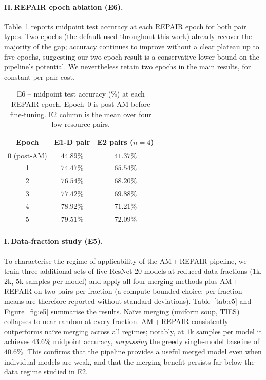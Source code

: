 \documentclass{article}
\begin{document}
\paragraph{H.\,REPAIR epoch ablation (E6).}
Table~\ref{tab:repair_ablation} reports midpoint test accuracy at each REPAIR epoch for both pair types. Two epochs (the default used throughout this work) already recover the majority of the gap; accuracy continues to improve without a clear plateau up to five epochs, suggesting our two-epoch result is a conservative lower bound on the pipeline's potential. We nevertheless retain two epochs in the main results, for constant per-pair cost.

\begin{table}[h]
\caption{E6 -- midpoint test accuracy (\%) at each REPAIR epoch. Epoch~0 is post-AM before fine-tuning. E2 column is the mean over four low-resource pairs.}
\label{tab:repair_ablation}
\begin{center}
\begin{small}
\begin{tabular}{ccc}
\toprule
Epoch & E1-D pair & E2 pairs ($n{=}4$) \\
\midrule
0 (post-AM) & $44.89\%$ & $41.37\%$ \\
1           & $74.47\%$ & $65.54\%$ \\
2           & $76.54\%$ & $68.20\%$ \\
3           & $77.42\%$ & $69.88\%$ \\
4           & $78.92\%$ & $71.21\%$ \\
5           & $79.51\%$ & $72.09\%$ \\
\bottomrule
\end{tabular}
\end{small}
\end{center}
\end{table}

\paragraph{I.\,Data-fraction study (E5).}
To characterise the regime of applicability of the AM\,+\,REPAIR pipeline, we train three additional sets of five ResNet-20 models at reduced data fractions ($1$k, $2$k, $5$k samples per model) and apply all four merging methods plus AM\,+\,REPAIR on two pairs per fraction (a compute-bounded choice; per-fraction means are therefore reported without standard deviations). Table~\ref{tab:e5} and Figure~\ref{fig:e5} summarise the results. Na\"ive merging (uniform soup, TIES) collapses to near-random at every fraction. AM\,+\,REPAIR consistently outperforms na\"ive merging across all regimes; notably, at $1$k samples per model it achieves $43.6\%$ midpoint accuracy, \emph{surpassing} the greedy single-model baseline of $40.6\%$. This confirms that the pipeline provides a useful merged model even when individual models are weak, and that the merging benefit persists far below the data regime studied in E2.
\end{document}
